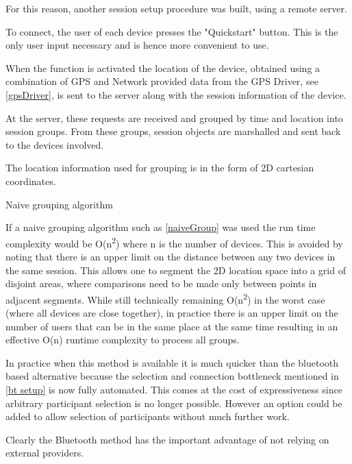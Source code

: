 For this reason, another session setup procedure was built, using a remote server.

To connect, the user of each device presses the "Quickstart" button. This is the only user input necessary and is hence more convenient to use.

When the function is activated the location of the device, obtained using a combination of GPS and Network provided data from the GPS Driver, see \ref{gpsDriver}, is sent to the server along with the session information of the device.

At the server, these requests are received and grouped by time and location into session groups. From these groups, session objects are marshalled and sent back to the devices involved.

The location information used for grouping is in the form of 2D cartesian coordinates.

\begin{algorithm}
\caption{Naive grouping algorithm}
\label{naiveGroup}
\end{algorithm}

If a naive grouping algorithm such as \ref{naiveGroup} was used the run time complexity would be O(n\textsuperscript{2}) where n is the number of devices.
This is avoided by noting that there is an upper limit on the distance between any two devices in the same session. This allows one to segment the 2D location space into a grid of disjoint areas, where comparisons need to be made only between points in adjacent segments. While still technically remaining O(n\textsuperscript{2}) in the worst case (where all devices are close together), in practice there is an upper limit on the number of users that can be in the same place at the same time resulting in an effective O(n) runtime complexity to process all groups.

In practice when this method is available it is much quicker than the bluetooth based alternative because the selection and connection bottleneck mentioned in \ref{bt setup} is now fully automated. This comes at the cost of expressiveness since arbitrary participant selection is no longer possible. However an option could be added to allow selection of participants without much further work.

Clearly the Bluetooth method has the important advantage of not relying on external providers.

